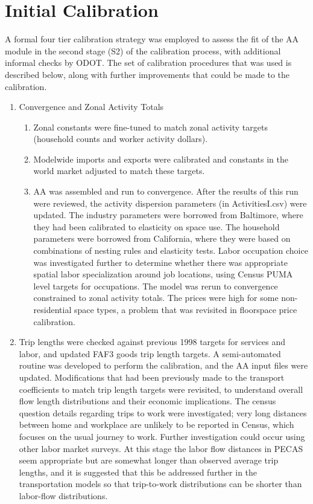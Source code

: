 \section{Initial Calibration}\label{sec:aa-initial-calibration}
A formal four tier calibration strategy was employed to assess the fit of the AA module in the second stage (S2) of the calibration process, with additional informal checks by ODOT. The set of calibration procedures that was used is described below, along with further improvements that could be made to the calibration.
\begin{enumerate}
\item Convergence and Zonal Activity Totals
\begin{enumerate}
\item Zonal constants were fine-tuned to match zonal activity targets (household counts and worker activity dollars).
\item Modelwide imports and exports were calibrated and constants in the world market adjusted to match these targets.
\item AA was assembled and run to convergence. After the results of this run were reviewed, the activity dispersion parameters (in ActivitiesI.csv) were updated. The industry parameters were borrowed from Baltimore, where they had been calibrated to elasticity on space use.  The household parameters were borrowed from California, where they were based on combinations of nesting rules and elasticity tests. Labor occupation choice was investigated further to determine whether there was appropriate spatial labor specialization around job locations, using Census PUMA level targets for occupations. The model was rerun to convergence constrained to zonal activity totals. The prices were high for some non-residential space types, a problem that was revisited in floorspace price calibration.
\end{enumerate}
\item Trip lengths were checked against previous 1998 targets for services and labor, and updated FAF3 goods trip length targets. A semi-automated routine was developed to perform the calibration, and the AA input files were updated. Modifications that had been previously made to the transport coefficients to match trip length targets were revisited, to understand overall flow length distributions and their economic implications. The census question details regarding trips to work were investigated; very long distances between home and workplace are unlikely to be reported in Census, which focuses on the usual journey to work.  Further investigation could occur using other labor market surveys. At this stage the labor flow distances in PECAS seem appropriate but are somewhat longer than observed average trip lengths, and it is suggested that this be addressed further in the transportation models so that trip-to-work distributions can be shorter than labor-flow distributions.

\end{enumerate}
